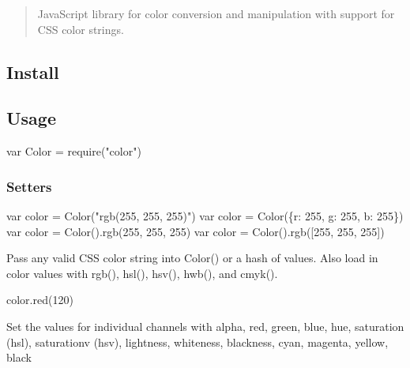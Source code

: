 \begin{quote}
Java\+Script library for color conversion and manipulation with support for C\+SS color strings. \end{quote}





\subsection*{Install}




\subsection*{Usage}


\begin{DoxyCode}
var Color = require("color")
\end{DoxyCode}


\subsubsection*{Setters}


\begin{DoxyCode}
var color = Color("rgb(255, 255, 255)")
var color = Color(\{r: 255, g: 255, b: 255\})
var color = Color().rgb(255, 255, 255)
var color = Color().rgb([255, 255, 255])
\end{DoxyCode}
 Pass any valid C\+SS color string into {\ttfamily Color()} or a hash of values. Also load in color values with {\ttfamily rgb()}, {\ttfamily hsl()}, {\ttfamily hsv()}, {\ttfamily hwb()}, and {\ttfamily cmyk()}.


\begin{DoxyCode}
color.red(120)
\end{DoxyCode}
 Set the values for individual channels with {\ttfamily alpha}, {\ttfamily red}, {\ttfamily green}, {\ttfamily blue}, {\ttfamily hue}, {\ttfamily saturation} (hsl), {\ttfamily saturationv} (hsv), {\ttfamily lightness}, {\ttfamily whiteness}, {\ttfamily blackness}, {\ttfamily cyan}, {\ttfamily magenta}, {\ttfamily yellow}, {\ttfamily black}


